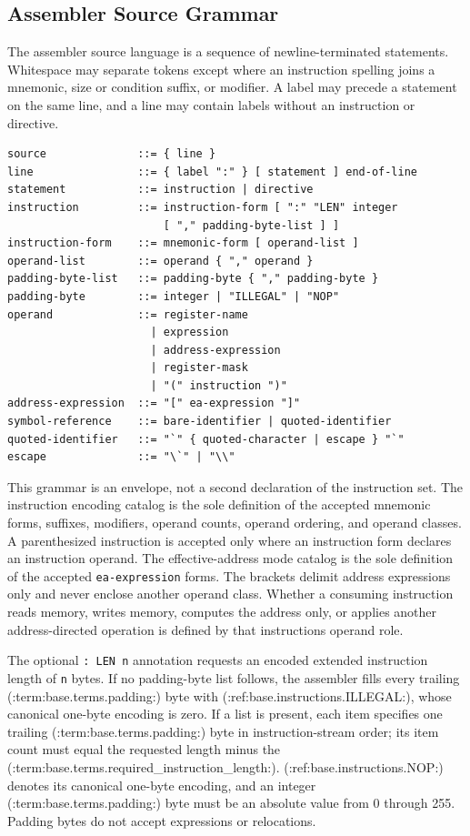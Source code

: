 \subsection*{Assembler Source Grammar}
The assembler source language is a sequence of newline-terminated statements. Whitespace may separate tokens except
where an instruction spelling joins a mnemonic, size or condition suffix, or modifier. A label may precede a
statement on the same line, and a line may contain labels without an instruction or directive.

\begin{verbatim}
source              ::= { line }
line                ::= { label ":" } [ statement ] end-of-line
statement           ::= instruction | directive
instruction         ::= instruction-form [ ":" "LEN" integer
                        [ "," padding-byte-list ] ]
instruction-form    ::= mnemonic-form [ operand-list ]
operand-list        ::= operand { "," operand }
padding-byte-list   ::= padding-byte { "," padding-byte }
padding-byte        ::= integer | "ILLEGAL" | "NOP"
operand             ::= register-name
                      | expression
                      | address-expression
                      | register-mask
                      | "(" instruction ")"
address-expression  ::= "[" ea-expression "]"
symbol-reference    ::= bare-identifier | quoted-identifier
quoted-identifier   ::= "`" { quoted-character | escape } "`"
escape              ::= "\`" | "\\"
\end{verbatim}

This grammar is an envelope, not a second declaration of the instruction set. The instruction encoding catalog is
the sole definition of the accepted mnemonic forms, suffixes, modifiers, operand counts, operand ordering, and
operand classes. A parenthesized instruction is accepted only where an instruction form declares an instruction
operand. The effective-address mode catalog is the sole definition of the accepted \texttt{ea-expression} forms.
The brackets delimit address expressions only and never enclose another operand class. Whether a consuming
instruction reads memory, writes memory, computes the address only, or applies another address-directed operation is
defined by that instruction\textquotesingle{}s operand role.

The optional \texttt{: LEN n} annotation requests an encoded extended instruction length of \texttt{n} bytes. If no
padding-byte list follows, the assembler fills every trailing (:term:base.terms.padding:) byte with (:ref:base.instructions.ILLEGAL:), whose canonical
one-byte encoding is zero. If a list is present, each item specifies one trailing (:term:base.terms.padding:) byte in instruction-stream
order; its item count must equal the requested length minus the (:term:base.terms.required_instruction_length:). (:ref:base.instructions.NOP:) denotes its
canonical one-byte encoding, and an integer (:term:base.terms.padding:) byte must be an absolute value from 0 through 255. Padding bytes do
not accept expressions or relocations.

